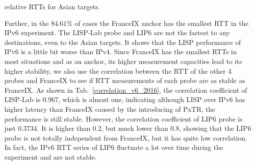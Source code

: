 relative RTTs for Asian targets.

Further, in the $84.61\%$ of cases the FranceIX anchor has the smallest RTT in the IPv6 experiment. The LISP-Lab probe and LIP6 are not the fastest to any destinations, even to the Asian targets. It shows that the LISP performance of IPv6 is a little bit worse than IPv4. Since FranceIX has the smallest RTTs in most situations and as an anchor, its higher measurement capacities lead to its higher stability, we also use the correlation between the RTT of the other 4 probes and FranceIX to see if RTT measurements of each probe are as stable as FranceIX. As shown in Tab.~\ref{correlation_v6_2016}, the correlation coefficient of LISP-Lab is 0.967, which is almost one, indicating although LISP over IPv6 has higher latency than FranceIX caused by the introducing of PxTR, the performance is still stable. However, the correlation coefficient of LIP6 probe is just 0.3734. It is higher than 0.2, but much lower than 0.8, showing that the LIP6 probe is not totally independent from FranceIX, but it has quite low correlation. In fact, the IPv6 RTT series of LIP6 fluctuate a lot over time during the experiment and are not stable.

%
\begin{table}[!tb]
	\centering
	\caption{Correlation coefficient to FranceIX (IPv6) from Dataset 2016}
	\label{correlation_v6_2016}{
	}
\end{table}


